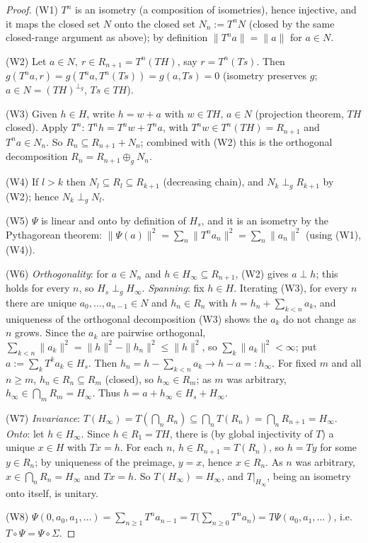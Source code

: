 \documentclass[11pt,a4paper]{article}
\theoremstyle{definition}
\theoremstyle{remark}
\newcommand{\pg}{\perp_g}
\begin{document}
\begin{proof}
(W1) $T^n$ is an isometry (a composition of isometries), hence injective, and it maps the
closed set $N$ onto the closed set $N_n:=T^nN$ (closed by the same closed-range argument as
above); by definition $\|T^na\|=\|a\|$ for $a\in N$.

(W2) Let $a\in N,\ r\in R_{n+1}=T^n(TH)$, say $r=T^n(Ts)$. Then
$g(T^na,r)=g(T^na,T^n(Ts))=g(a,Ts)=0$ (isometry preserves $g$; $a\in N=(TH)^{\pg}$,
$Ts\in TH$).

(W3) Given $h\in H$, write $h=w+a$ with $w\in TH,\,a\in N$ (projection theorem, $TH$
closed). Apply $T^n$: $T^nh=T^nw+T^na$, with $T^nw\in T^n(TH)=R_{n+1}$ and $T^na\in N_n$. So
$R_n\subseteq R_{n+1}+N_n$; combined with (W2) this is the orthogonal decomposition
$R_n=R_{n+1}\oplus_g N_n$.

(W4) If $l>k$ then $N_l\subseteq R_l\subseteq R_{k+1}$ (decreasing chain), and
$N_k\perp_gR_{k+1}$ by (W2); hence $N_k\perp_gN_l$.

(W5) $\Psi$ is linear and onto by definition of $H_s$, and it is an isometry by the
Pythagorean theorem: $\|\Psi(a)\|^2=\sum_n\|T^na_n\|^2=\sum_n\|a_n\|^2$ (using (W1),(W4)).

(W6) \emph{Orthogonality}: for $a\in N_n$ and $h\in H_\infty\subseteq R_{n+1}$, (W2) gives
$a\perp h$; this holds for every $n$, so $H_s\perp_gH_\infty$. \emph{Spanning}: fix $h\in H$.
Iterating (W3), for every $n$ there are unique $a_0,\dots,a_{n-1}\in N$ and $h_n\in R_n$ with
$h=h_n+\sum_{k<n}a_k$, and uniqueness of the orthogonal decomposition (W3) shows the $a_k$ do
not change as $n$ grows. Since the $a_k$ are pairwise orthogonal,
$\sum_{k<n}\|a_k\|^2=\|h\|^2-\|h_n\|^2\le\|h\|^2$, so $\sum_k\|a_k\|^2<\infty$; put
$a:=\sum_kT^ka_k\in H_s$. Then $h_n=h-\sum_{k<n}a_k\to h-a=:h_\infty$. For fixed $m$ and all
$n\ge m$, $h_n\in R_n\subseteq R_m$ (closed), so $h_\infty\in R_m$; as $m$ was arbitrary,
$h_\infty\in\bigcap_mR_m=H_\infty$. Thus $h=a+h_\infty\in H_s+H_\infty$.

(W7) \emph{Invariance}: $T(H_\infty)=T(\bigcap_nR_n)\subseteq\bigcap_nT(R_n)=\bigcap_nR_{n+1}=H_\infty$.
\emph{Onto}: let $h\in H_\infty$. Since $h\in R_1=TH$, there is (by global injectivity of $T$)
a unique $x\in H$ with $Tx=h$. For each $n$, $h\in R_{n+1}=T(R_n)$, so $h=Ty$ for some
$y\in R_n$; by uniqueness of the preimage, $y=x$, hence $x\in R_n$. As $n$ was arbitrary,
$x\in\bigcap_nR_n=H_\infty$ and $Tx=h$. So $T(H_\infty)=H_\infty$, and $T|_{H_\infty}$, being
an isometry onto itself, is unitary.

(W8) $\Psi(0,a_0,a_1,\dots)=\sum_{n\ge1}T^na_{n-1}=T\big(\sum_{n\ge0}T^na_n\big)=T\Psi(a_0,a_1,\dots)$,
i.e. $T\circ\Psi=\Psi\circ\Sigma$.
\end{proof}
\end{document}
